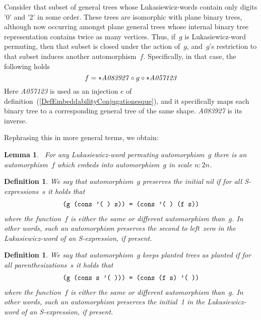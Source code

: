 \documentclass[11pt]{article} %
\newtheorem{lemma}{Lemma}
\newcommand{\eqn}[1]{(\ref{#1})}
\newcommand{\eeq}{\end{equation}}
\newcommand{\beql}[1]{\begin{equation}\label{#1}}
\newcommand{\autname}[1]{{\it *#1}}
\newcommand{\autletter}[1]{$#1$}
\newcommand{\automorphismlet}[1]{automorphism~\autletter{#1}}
\newcommand{\scmcode}[1]{{\tt{#1}}}
\newtheorem{definition}[theorem]{Definition}
\newenvironment{scmdefinefun}{\begin{tabular}{l l l p{5cm}}}{\end{tabular}}
\newcommand{\funapply}{\ensuremath{\circ}}
\begin{document}
Consider that subset of general trees whose
Lukasiewicz-words contain only digits '0' and '2' in some order.
These trees are isomorphic with plane binary trees,
although now occurring amongst plane general trees
whose internal binary tree representation contains twice as
many vertices.
Thus, if~\autletter{g} is Lukasiewicz-word
permuting, then that subset is closed under the action of~\autletter{g}, and~\autletter{g}'s
restriction to that subset induces another \automorphismlet{f}.
Specifically, in that case, the following holds
\beql{GeneralEqForBinary2GeneralTreeEmbedding}
f = \autname{A083927}\funapply{g}\funapply\autname{A057123}
\eeq
Here \autname{A057123} is used as an injection $e$ of
definition~\eqn{DefEmbeddabilityConjugationesque}, and it specifically maps
each binary tree to a corresponding general tree of the
same shape. \autname{A083927} is its inverse.

Rephrasing this in more general terms, we obtain:
\begin{lemma}~\label{lukaembed}
For any Lukasiewicz-word permuting \automorphismlet{g}
there is
an \automorphismlet{f} which {embeds into}
\automorphismlet{g} {in scale} $n:2n$.
\end{lemma}

\begin{definition} %
\normalfont
We say that \automorphismlet{g} preserves the {\em initial nil}
if for all
S-expressions~$s$ it holds that
\beql{EqInitialNils}
\begin{scmdefinefun}
\scmcode{(g (cons '( ) s)) = (cons '( ) (f s))}
\end{scmdefinefun}
\eeq
where the function~$f$ is either the same or different
automorphism than~$g$. In other words, such an automorphism
preserves the second to left~zero in the Lukasiewicz-word of
an S-expression, if present.

\end{definition}

\begin{definition} %
\normalfont
We say that \automorphismlet{g} keeps {\em planted trees as planted}
if for all parenthesizations~$s$ it holds that
\beql{EqInitialOnes}
\begin{scmdefinefun}
\scmcode{(g (cons s '( ))) = (cons (f s) '( ))}
\end{scmdefinefun}
\eeq
where the function~$f$ is either the same or different
automorphism than~$g$. In other words, such an automorphism
preserves the initial~1 in the Lukasiewicz-word of
an S-expression, if present.

\end{definition}
\end{document}
